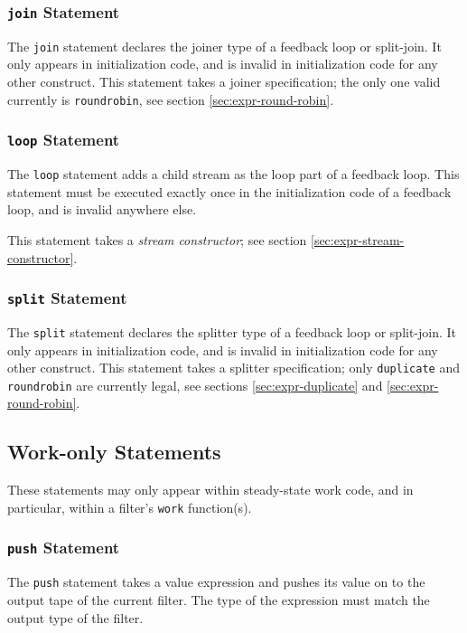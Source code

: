 \documentclass[11pt]{article}
\begin{document}
\subsubsection{\lstinline|join| Statement}

The \lstinline|join| statement declares the joiner type of a feedback
loop or split-join.  It only appears in initialization code, and is
invalid in initialization code for any other construct.  This
statement takes a joiner specification; the only one valid currently
is \lstinline|roundrobin|, see section \ref{sec:expr-round-robin}.

\subsubsection{\lstinline|loop| Statement}

The \lstinline|loop| statement adds a child stream as the loop part of
a feedback loop.  This statement must be executed exactly once in the
initialization code of a feedback loop, and is invalid anywhere else.

This statement takes a \emph{stream constructor}; see section
\ref{sec:expr-stream-constructor}.

\subsubsection{\lstinline|split| Statement}

The \lstinline|split| statement declares the splitter type of a feedback
loop or split-join.  It only appears in initialization code, and is
invalid in initialization code for any other construct.  This
statement takes a splitter specification; only \lstinline|duplicate| and
\lstinline|roundrobin| are currently legal, see sections
\ref{sec:expr-duplicate} and \ref{sec:expr-round-robin}.


\subsection{Work-only Statements}

These statements may only appear within steady-state work code, and in
particular, within a filter's \lstinline|work| function(s).

\subsubsection{\lstinline|push| Statement}

The \lstinline|push| statement takes a value expression and pushes its
value on to the output tape of the current filter.  The type of the
expression must match the output type of the filter.
\end{document}
